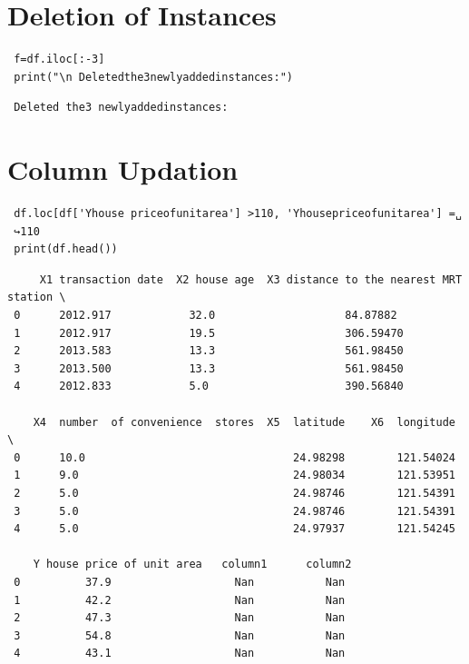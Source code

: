\section{Deletion of Instances}
\begin{lstlisting}
 f=df.iloc[:-3]
 print("\n Deletedthe3newlyaddedinstances:")
\end{lstlisting}
\begin{verbatim}
 Deleted the3 newlyaddedinstances:               
\end{verbatim}
\section{Column Updation}
\begin{lstlisting}
 df.loc[df['Yhouse priceofunitarea'] >110, 'Yhousepriceofunitarea'] =␣
 ↪110
 print(df.head())
\end{lstlisting}
\begin{verbatim}
     X1 transaction date  X2 house age  X3 distance to the nearest MRT station \
 0      2012.917            32.0                    84.87882
 1      2012.917            19.5                    306.59470
 2      2013.583            13.3                    561.98450
 3      2013.500            13.3                    561.98450
 4      2012.833            5.0                     390.56840
 
    X4  number  of convenience  stores  X5  latitude    X6  longitude \
 0      10.0                                24.98298        121.54024
 1      9.0                                 24.98034        121.53951
 2      5.0                                 24.98746        121.54391
 3      5.0                                 24.98746        121.54391
 4      5.0                                 24.97937        121.54245
 
    Y house price of unit area   column1      column2   
 0          37.9                   Nan           Nan 
 1          42.2                   Nan           Nan 
 2          47.3                   Nan           Nan 
 3          54.8                   Nan           Nan 
 4          43.1                   Nan           Nan   
             
\end{verbatim}
